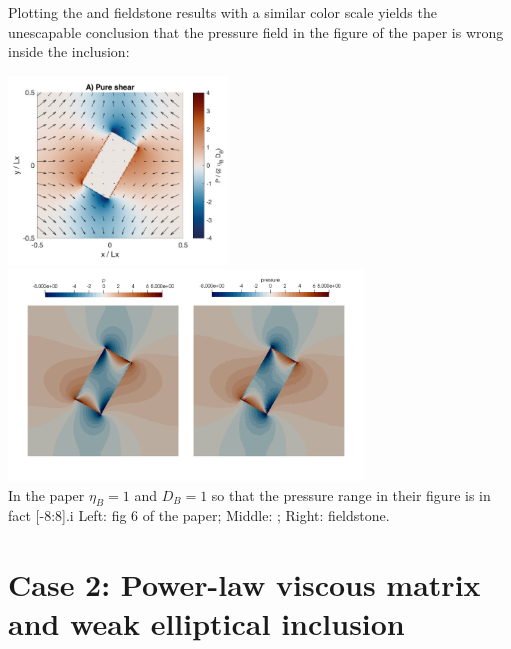 Plotting the \aspect and fieldstone results with a similar
color scale yields the unescapable conclusion that {\color{red} the pressure field 
in the figure of the paper is wrong inside the inclusion}:
\begin{center}
\includegraphics[height=5cm]{python_codes/fieldstone_142/images/hams22_cc}
\includegraphics[height=5.6cm]{python_codes/fieldstone_142/results/case1/aspect/press2}\\
{\captionfont In the paper $\eta_B=1$ and $D_B=1$ so that the pressure range in their
figure is in fact [-8:8].i Left: fig 6 of the paper; Middle: \aspect; Right: fieldstone.}
\end{center}

\newpage
\section*{Case 2: Power-law viscous matrix and weak elliptical inclusion}


